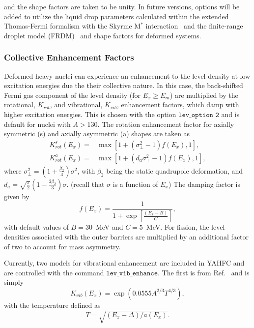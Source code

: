 \documentclass[
10pt,
showpacs,preprintnumbers,footinbib,
amsfonts,amsmath,amssymb,
aps,
prc,twocolumn,groupedaddress,superscriptaddress,
showkeys,
nofootinbib
]{revtex4-1}
\begin{document}
and the shape factors are taken to be unity. In future versions, options will be added to utilize the liquid drop parameters calculated within the extended Thomas-Fermi formalism with the Skyrme M$^*$ interaction~\cite{Guet:1988} and the finite-range droplet model (FRDM)~\cite{Moller:1997} and shape factors for deformed systems.

\subsubsection{Collective Enhancement Factors}

Deformed heavy nuclei can experience an enhancement to the level density at low excitation energies due the their collective nature. In this case, the back-shifted Fermi gas component of the level density (for $E_x \ge E_m$) are multiplied by the rotational, $K_{rot}$, and vibrational, $K_{vib}$, enhancement factors, which damp with higher excitation energies. This is chosen with the option ${\texttt {lev\_option 2}}$ and is default for nuclei with $A > 130$. The rotation enhancement factor for axially symmetric (s) and axially asymmetric (a) shapes are taken as~\cite{TALYS,Junghans:1998,Capote:2009}
\begin{align}
K_{rot}^s(E_x) =& \max [1 + (\sigma^2_\perp-1)f(E_x),1], \\
K_{rot}^a(E_x) =& \max [1 + (d_a\sigma^2_\perp-1)f(E_x),1], 
\end{align}
where $\sigma^2_\perp = (1+ \frac{\beta_2}{3})\sigma^2$, with $\beta_2$ being the static quadrupole deformation, and $d_a = \sqrt{\frac{\pi}{2}}(1-\frac{2\beta_2}{3})\sigma$. (recall that $\sigma$ is a function of $E_x$) The damping factor is given by
\begin{equation}
f(E_x) = \frac{1}{1+\exp\left [\frac{(E_x-B)}{C}\right ]},
\end{equation}
with default values of $B=30$~MeV and $C=5$~MeV.  For fission, the level densities associated with the outer barriers are multiplied by an additional factor of two to account for mass asymmetry. 

Currently, two models for vibrational enhancement are included in YAHFC and are controlled with the command ${\texttt{lev\_vib\_enhance}}$.  The first is from Ref.~\cite{Iljinov:1992} and is simply
\begin{equation}
K_{vib}(E_x) = \exp\left ( 0.0555A^{2/3}T^{4/3}\right ),
\end{equation}
with the temperature defined as 
\begin{equation}
T = \sqrt{(E_x - \Delta)/a(E_x)}.
\end{equation}
\end{document}
